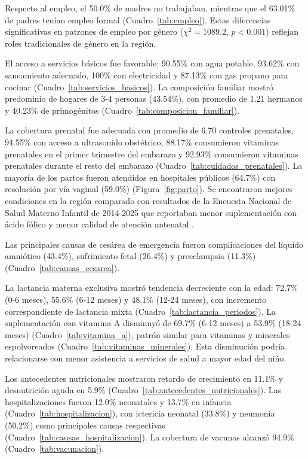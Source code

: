 Respecto al empleo, el 50.0\% de madres no trabajaban, mientras que el 63.01\% 
de padres tenían empleo formal (Cuadro~\ref{tab:empleo}). Estas diferencias 
significativas en patrones de empleo por género ($\chi^2 = 1089.2$, 
$p < 0.001$) reflejan roles tradicionales de género en la región.

El acceso a servicios básicos fue favorable: 90.55\% con agua potable, 93.62\% 
con saneamiento adecuado, 100\% con electricidad y 87.13\% con gas propano 
para cocinar (Cuadro~\ref{tab:servicios_basicos}). La composición familiar
mostró predominio de hogares de 3-4 personas (43.54\%), con promedio de 1.21 
hermanos y 40.23\% de primogénitos (Cuadro~\ref{tab:composicion_familiar}).

La cobertura prenatal fue adecuada con promedio de 6.70 controles prenatales, 
94.55\% con acceso a ultrasonido obstétrico, 88.17\% consumieron vitaminas
prenatales en el primer trimestre del embarazo y 92.93\% consumieron vitaminas
prenatales durante el resto del embarazo (Cuadro~\ref{tab:cuidados_prenatales}). 
La mayoría de los partos fueron atendidos en hospitales públicos (64.7\%) con 
resolución por vía vaginal (59.0\%) (Figura~\ref{fig:parto}). Se encontraron
mejores condiciones en la región comparado con resultados de la Encuesta
Nacional de Salud Materno Infantil de 2014-2025 que reportaban menor
suplementación con ácido fólico y menor calidad de atención antenatal
\cite{Santos2025}.

Las principales causas de cesárea de emergencia fueron complicaciones del 
líquido amniótico (43.4\%), sufrimiento fetal (26.4\%) y preeclampsia (11.3\%) 
(Cuadro~\ref{tab:causas_cesarea}).

La lactancia materna exclusiva mostró tendencia decreciente con la edad: 72.7\% 
(0-6 meses), 55.6\% (6-12 meses) y 48.1\% (12-24 meses), con incremento 
correspondiente de lactancia mixta (Cuadro~\ref{tab:lactancia_periodos}). La 
suplementación con vitamina A disminuyó de 69.7\% (6-12 meses) a 53.9\% 
(18-24 meses) (Cuadro~\ref{tab:vitamina_a}), patrón similar para vitaminas y 
minerales espolvoreados (Cuadro~\ref{tab:vitaminas_minerales}). Esta disminución
podría relacionarse con menor asistencia a servicios de salud a mayor edad del
niño.

Los antecedentes nutricionales mostraron retardo de crecimiento en 11.1\% y 
desnutrición aguda en 5.9\% (Cuadro~\ref{tab:antecedentes_nutricionales}). Las
hospitalizaciones fueron 12.0\% neonatales y 13.7\% en infancia 
(Cuadro~\ref{tab:hospitalizacion}), con ictericia neonatal (33.8\%) y neumonía 
(50.2\%) como principales causas respectivas
(Cuadro~\ref{tab:causas_hospitalizacion}). La cobertura de vacunas alcanzó
94.9\% (Cuadro~\ref{tab:vacunacion}).

